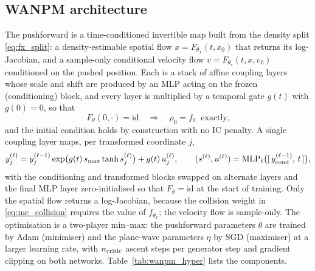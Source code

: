 \documentclass[11pt]{article}
\theoremstyle{plain}
\begin{document}
\subsection{WANPM architecture}
\label{sec:wanpm_arch}
The pushforward is a time-conditioned invertible map built from the density split \eqref{eq:fx_split}: a
density-estimable spatial flow $x=F_{\theta_x}(t,x_0)$ that returns its log-Jacobian, and a sample-only conditional
velocity flow $v=F_{\theta_v}(t,x,v_0)$ conditioned on the pushed position. Each is a stack of affine coupling
layers whose scale and shift are produced by an MLP acting on the frozen (conditioning) block, and every layer is
multiplied by a temporal gate $g(t)$ with $g(0)=0$, so that
\begin{equation}
F_\theta(0,\cdot)=\mathrm{id}\quad\Longrightarrow\quad \rho_0=f_0\ \text{ exactly,}
\label{eq:gate_id}
\end{equation}
and the initial condition holds by construction with no IC penalty. A single coupling layer maps, per transformed
coordinate $j$,
\begin{equation}
y^{(\ell)}_j=y^{(\ell-1)}_j\exp\!\big(g(t)\,s_{\max}\tanh s^{(\ell)}_j\big)+g(t)\,u^{(\ell)}_j,\qquad
(s^{(\ell)},u^{(\ell)})=\mathrm{MLP}_\ell\big([\,y^{(\ell-1)}_{\rm cond},\,t\,]\big),
\label{eq:coupling}
\end{equation}
with the conditioning and transformed blocks swapped on alternate layers and the final MLP layer zero-initialised so that $F_\theta=\mathrm{id}$ at the start of training. Only the spatial flow returns a log-Jacobian, because the collision weight in \eqref{eq:mc_collision} requires the value of $f_{\theta_x}$; the velocity flow is sample-only. The optimisation is a two-player min--max: the pushforward parameters $\theta$ are trained by Adam (minimiser) and the plane-wave parameters $\eta$ by SGD (maximiser) at a larger learning rate, with $n_{\rm critic}$ ascent steps per
generator step and gradient clipping on both networks. Table~\ref{tab:wanpm_hyper} lists the components.
\end{document}
